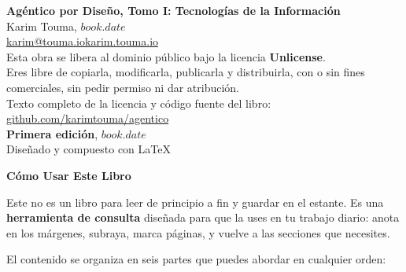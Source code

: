 \documentclass[$if(classoption)$$for(classoption)$$classoption$$sep$,$endfor$$endif$]{paradigma-agentico}
\begin{document}
\vspace*{\fill}
\begin{flushleft}
  \small\sffamily\color{pa-darktext}
  \textbf{Agéntico por Diseño, Tomo I: Tecnologías de la Información}\\[12pt]
  Karim Touma, $book.date$\\[6pt]
  \href{mailto:karim@touma.io}{karim@touma.io}\enspace\textbar\enspace\href{https://karim.touma.io}{karim.touma.io}\\[18pt]
  Esta obra se libera al dominio p\'{u}blico bajo la licencia \textbf{Unlicense}.\\[6pt]
  Eres libre de copiarla, modificarla, publicarla y distribuirla, con o sin
  fines comerciales, sin pedir permiso ni dar atribuci\'{o}n.\\[6pt]
  Texto completo de la licencia y c\'{o}digo fuente del libro:\\[2pt]
  \href{https://github.com/karimtouma/agentico}{github.com/karimtouma/agentico}\\[18pt]
  \textbf{Primera edición}, $book.date$\\[6pt]
  Diseñado y compuesto con \LaTeX{}
\end{flushleft}
\clearpage

\pagestyle{paradigma-plain}
\vspace*{0.5cm}
{\centering\fontsize{20}{24}\selectfont\sffamily\bfseries\color{pa-primary}Cómo Usar Este Libro\par}
\vspace{1cm}

\noindent\color{pa-darktext}
Este no es un libro para leer de principio a fin y guardar en el estante.
Es una \textbf{herramienta de consulta} diseñada para que la uses en tu trabajo diario:
anota en los márgenes, subraya, marca páginas, y vuelve a las secciones que necesites.

\vspace{1em}


\vspace{0.5em}
\noindent El contenido se organiza en seis partes que puedes abordar en cualquier orden:
\end{document}
